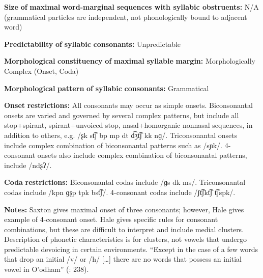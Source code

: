 \documentclass[output=paper]{langsci/langscibook}
\begin{document}
\begin{styleBody}
\textbf{Size} \textbf{of} \textbf{maximal} \textbf{word{}-marginal sequences with syllabic obstruents:} N/A (grammatical particles are independent, not phonologically bound to adjacent word)
\end{styleBody}

\begin{styleBody}
\textbf{Predictability} \textbf{of} \textbf{syllabic} \textbf{consonants:} Unpredictable
\end{styleBody}

\begin{styleBody}
\textbf{Morphological} \textbf{constituency} \textbf{of} \textbf{maximal} \textbf{syllable} \textbf{margin:} Morphologically Complex (Onset, Coda)
\end{styleBody}

\begin{styleBody}
\textbf{Morphological} \textbf{pattern} \textbf{of} \textbf{syllabic} \textbf{consonants:} Grammatical
\end{styleBody}

\begin{styleBody}
\textbf{Onset} \textbf{restrictions:} All consonants may occur as simple onsets. Biconsonantal onsets are varied and governed by several complex patterns, but include all stop+spirant, spirant+unvoiced stop, nasal+homorganic nonnasal sequences, in addition to others, e.g. /ʂk st͡ʃ bp mp dt d͡ʒt͡ʃ kk nɡ/. Triconsonantal onsets include complex combination of biconsonantal patterns such as /sɲk/. 4-consonant onsets also include complex combination of biconsonantal patterns, include /ndʂʔ/.
\end{styleBody}

\begin{styleBody}
\textbf{Coda} \textbf{restrictions:} Biconsonantal codas include /ɡs dk ms/. Triconsonantal codas include /kpn ɡʂp tpk bst͡ʃ/. 4-consonant codas include /ʃt͡ʃkt͡ʃ t͡ʃspk/.
\end{styleBody}

\begin{styleBody}
\textbf{Notes:} Saxton gives maximal onset of three consonants; however, Hale gives example of 4-consonant onset. Hale gives specific rules for consonant combinations, but these are difficult to interpret and include medial clusters. Description of phonetic characteristics is for clusters, not vowels that undergo predictable devoicing in certain environments. “Except in the case of a few words that drop an initial /v/ or /h/ […] there are no words that possess an initial vowel in O’odham” (\citealt{DoloresMathiot1991}: 238).
\end{styleBody}
\end{document}
